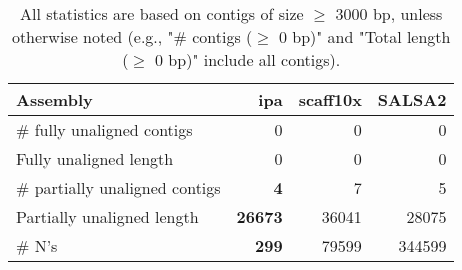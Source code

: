 \documentclass[12pt,a4paper]{article}
\begin{document}
\begin{table}[ht]
\begin{center}
\caption{All statistics are based on contigs of size $\geq$ 3000 bp, unless otherwise noted (e.g., "\# contigs ($\geq$ 0 bp)" and "Total length ($\geq$ 0 bp)" include all contigs).}
\begin{tabular}{|l*{3}{|r}|}
\hline
Assembly & ipa & scaff10x & SALSA2 \\ \hline
\# fully unaligned contigs & 0 & 0 & 0 \\ \hline
Fully unaligned length & 0 & 0 & 0 \\ \hline
\# partially unaligned contigs & {\bf 4} & 7 & 5 \\ \hline
Partially unaligned length & {\bf 26673} & 36041 & 28075 \\ \hline
\# N's & {\bf 299} & 79599 & 344599 \\ \hline
\end{tabular}
\end{center}
\end{table}
\end{document}
